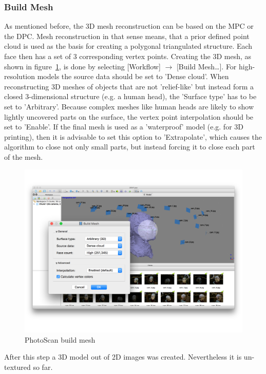 \documentclass[12pt,a4paper]{scrartcl}
\begin{document}
\subsubsection{Build Mesh}
As mentioned before, the 3D mesh reconstruction can be based on the MPC or the DPC. Mesh reconstruction in that sense means, that a prior defined point cloud is used as the basis for creating a polygonal triangulated structure. Each face then has a set of 3 corresponding vertex points. Creating the 3D mesh, as shown in figure~\ref{fig:photoscanmesh}, is done by selecting [Workflow] $\rightarrow$ [Build Mesh\dots]. For high-resolution models the source data should be set to 'Dense cloud'. When reconstructing 3D meshes of objects that are not 'relief-like' but instead form a closed 3-dimensional structure (e.g. a human head), the 'Surface type' has to be set to 'Arbitrary'. Because complex meshes like human heads are likely to show lightly uncovered parts on the surface, the vertex point interpolation should be set to 'Enable'.  If the final mesh is used as a 'waterproof' model (e.g. for 3D printing), then it is advisable to set this option to 'Extrapolate', which causes the algorithm to close not only small parts, but instead forcing it to close each part of the mesh.
\begin{figure}[!h]
  \includegraphics[width=1\textwidth]{PhotoScan-mesh}
  \caption{PhotoScan build mesh}
  \label{fig:photoscanmesh}
\end{figure}
After this step a 3D model out of 2D images was created. Nevertheless it is un-textured so far.
\end{document}
